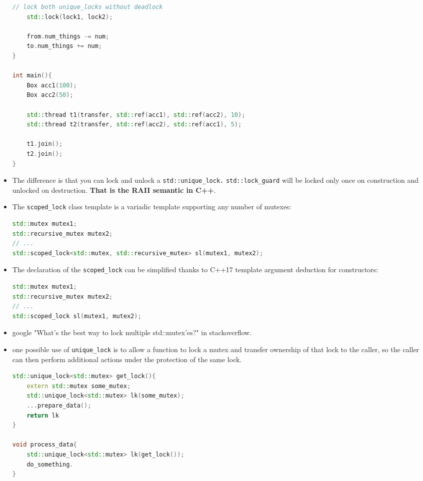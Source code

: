 \documentclass[a4paper,11pt,twoside]{book}
\begin{document}
\begin{itemize}
\begin{lstlisting}[frame=single, language=c++]
	// lock both unique_locks without deadlock
	std::lock(lock1, lock2);
	
	from.num_things -= num;
	to.num_things += num;
}

int main(){
	Box acc1(100);
	Box acc2(50);
	
	std::thread t1(transfer, std::ref(acc1), std::ref(acc2), 10);
	std::thread t2(transfer, std::ref(acc2), std::ref(acc1), 5);
	
	t1.join();
	t2.join();
}
\end{lstlisting}			

    \item The difference is that you can lock and unlock a \texttt{std::unique\_lock.} \texttt{std::lock\_guard} will be locked only once on construction and unlocked on destruction. \textbf{That is the RAII semantic in C++}.
	
	\item The \texttt{scoped\_lock} class template is a variadic template supporting any number of mutexes:
\begin{lstlisting}[frame=single, language=c++]	
std::mutex mutex1;
std::recursive_mutex mutex2;
// ...
std::scoped_lock<std::mutex, std::recursive_mutex> sl(mutex1, mutex2);
\end{lstlisting}	
	
	\item The declaration of the \texttt{scoped\_lock} can be simplified thanks to C++17 template argument deduction for constructors:
	
\begin{lstlisting}[frame=single, language=c++]	
std::mutex mutex1;
std::recursive_mutex mutex2;
// ...
std::scoped_lock sl(mutex1, mutex2);
\end{lstlisting}

\item google "What's the best way to lock multiple std::mutex'es?" in stackoverflow. 

\item one possible use of \texttt{unique\_lock} is to allow a function to lock a mutex and transfer ownership of that lock to the caller, so the caller can then perform additional actions under the protection of the same lock. 

\begin{lstlisting}[frame=single, language=c++]	
std::unique_lock<std::mutex> get_lock(){
	extern std::mutex some_mutex;
	std::unique_lock<std::mutex> lk(some_mutex);
	...prepare_data();
	return lk
}

void process_data{
	std::unique_lock<std::mutex> lk(get_lock());
	do_something.
}
\end{lstlisting}


\end{itemize}
\end{document}
